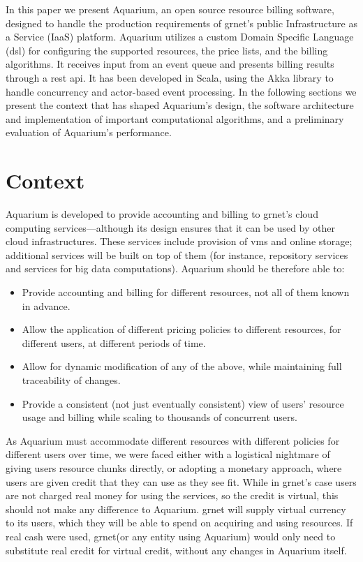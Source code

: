 \documentclass[letterpaper,twocolumn,10pt]{article}
\newcommand{\grnet}{{\sc grnet}\xspace}
\begin{document}
In this paper we present Aquarium, an open source resource billing
software, designed to handle the production requirements of \grnet's
public Infrastructure as a Service (IaaS) platform. Aquarium utilizes
a custom Domain Specific Language ({\sc dsl}) for configuring the
supported resources, the price lists, and the billing algorithms. It
receives input from an event queue and presents billing results
through a {\sc rest api}. It has been developed in Scala, using the
Akka library to handle concurrency and actor-based event processing.
In the following sections we present the context that has shaped
Aquarium's design, the software architecture and implementation of
important computational algorithms, and a preliminary evaluation of
Aquarium's performance.

\section{Context}

Aquarium is developed to provide accounting and billing to \grnet's
cloud computing services---although its design ensures that it can be
used by other cloud infrastructures. These services include provision
of {\sc vm}s and online storage; additional services will be built on
top of them (for instance, repository services and services for big
data computations). Aquarium should be therefore able to:

\begin{itemize}

\item Provide accounting and billing for different resources, not all
  of them known in advance.

\item Allow the application of different pricing policies to different
  resources, for different users, at different periods of time.

\item Allow for dynamic modification of any of the above, while
  maintaining full traceability of changes.

\item Provide a consistent (not just eventually consistent) view of
  users' resource usage and billing while scaling to thousands of
  concurrent users.

\end{itemize}

As Aquarium must accommodate different resources with different
policies for different users over time, we were faced either with a
logistical nightmare of giving users resource chunks directly, or
adopting a monetary approach, where users are given credit that they
can use as they see fit. While in \grnet's case users are not charged
real money for using the services, so the credit is virtual, this
should not make any difference to Aquarium. \grnet will supply virtual
currency to its users, which they will be able to spend on acquiring
and using resources. If real cash were used, \grnet (or any entity
using Aquarium) would only need to substitute real credit for virtual
credit, without any changes in Aquarium itself.
\end{document}
